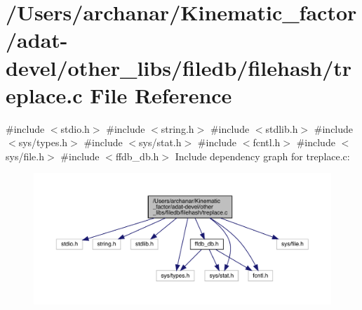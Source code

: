 \hypertarget{adat-devel_2other__libs_2filedb_2filehash_2treplace_8c}{}\section{/\+Users/archanar/\+Kinematic\+\_\+factor/adat-\/devel/other\+\_\+libs/filedb/filehash/treplace.c File Reference}
\label{adat-devel_2other__libs_2filedb_2filehash_2treplace_8c}
{\ttfamily \#include $<$stdio.\+h$>$}\newline
{\ttfamily \#include $<$string.\+h$>$}\newline
{\ttfamily \#include $<$stdlib.\+h$>$}\newline
{\ttfamily \#include $<$sys/types.\+h$>$}\newline
{\ttfamily \#include $<$sys/stat.\+h$>$}\newline
{\ttfamily \#include $<$fcntl.\+h$>$}\newline
{\ttfamily \#include $<$sys/file.\+h$>$}\newline
{\ttfamily \#include $<$ffdb\+\_\+db.\+h$>$}\newline
Include dependency graph for treplace.\+c\+:
\nopagebreak
\begin{figure}[H]
\begin{center}
\leavevmode
\includegraphics[width=350pt]{de/d3d/adat-devel_2other__libs_2filedb_2filehash_2treplace_8c__incl}
\end{center}
\end{figure}
